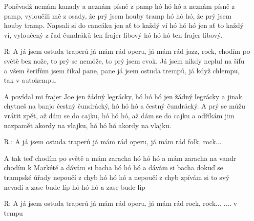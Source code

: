\resetVars
{}
\MakeHeader
\Lyrics

Poněvadž nemám kanady a neznám písně z pamp
hó hó hó a neznám písně z pamp,
vyloučili mě z osady, že prý jsem houby tramp
hó hó hó, že prý jsem houby tramp.
Napsali si do cancáku jen ať to každý ví
hó hó hó jen ať to každý ví,
vyloučený z řad čundráků ten frajer libový
hó hó hó ten frajer libový.

R: A já jsem ostuda traperů já mám rád operu, já mám rád jazz, rock,
chodím po světě bez nože, to prý se nemóže, to prý jsem cvok.
Já jsem nikdy neplul na šífu a všem šerifům jsem říkal pane, pane
já jsem ostuda trempů, já když chlempu, tak v autokempu.

A povídal mi frajer Joe jen žádný legrácky,
hó hó hó jen žádný legrácky
a jinak chytneš na banjo čestný čundrácký,
hó hó hó a čestný čundrácký.
A prý se můžu vrátit zpět, až dám se do cajku,
hó hó hó, až dám se do cajku
a odříkám jim nazpamět akordy na vlajku,
hó hó hó akordy na vlajku.


R.: A já jsem ostuda traperů já mám rád operu, já mám rád folk, rock...

A tak teď chodím po světě a mám zaracha
hó hó hó a mám zaracha
na vandr chodím k Markétě a dávám si bacha
hó hó hó a dávám si bacha
dokuď se trampské úřady nepoučí z chyb
hó hó hó a nepoučí z chyb
zpívám si to svý nevadí a zase bude líp
hó hó hó a zase bude líp

R: A já jsem ostuda traperů já mám rád operu, já mám rád rock, rock...
.... v tempu

\Next
